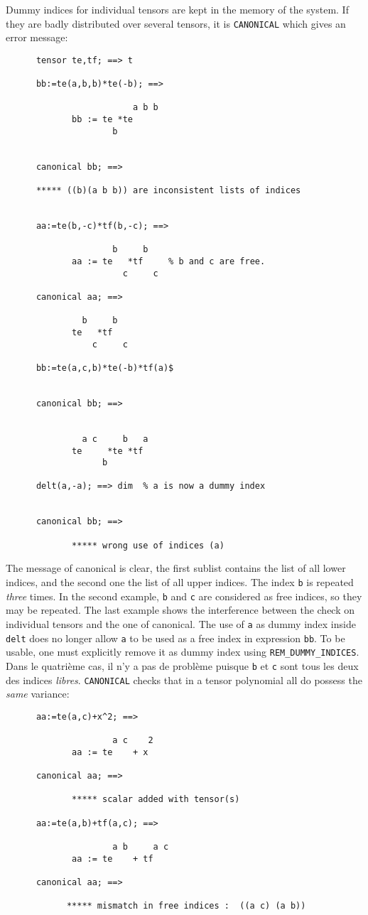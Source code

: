 Dummy indices for individual tensors are kept in the memory of 
the system. If they are badly distributed over several tensors,
it is \texttt{CANONICAL} which gives an error message:  
\begin{verbatim}
      tensor te,tf; ==> t

      bb:=te(a,b,b)*te(-b); ==>

                         a b b
             bb := te *te
                     b


      canonical bb; ==>

      ***** ((b)(a b b)) are inconsistent lists of indices


      aa:=te(b,-c)*tf(b,-c); ==>

                     b     b
             aa := te   *tf     % b and c are free.
                       c     c

      canonical aa; ==>

               b     b
             te   *tf
                 c     c

      bb:=te(a,c,b)*te(-b)*tf(a)$


      canonical bb; ==>


               a c     b   a
             te     *te *tf
                   b

      delt(a,-a); ==> dim  % a is now a dummy index


      canonical bb; ==>

             ***** wrong use of indices (a)
\end{verbatim}
The message of canonical is clear, the first sublist contains the 
list of all lower indices, and the second one the list of all upper 
indices. The index  \texttt{b} is repeated \emph{three} times.
In the second example, \texttt{b} and \texttt{c} are considered as free
indices, so they may be repeated.
The last example shows the interference between the check on 
individual tensors and the one of canonical. The use of \texttt{a}
as dummy index inside \texttt{delt} does no longer allow \texttt{a}  
to be used as a free index in expression \texttt{bb}. 
To be usable, one must explicitly remove it as dummy index 
using \texttt{REM\_DUMMY\_INDICES}.
Dans le quatri\`eme cas, il n'y a pas de probl\`eme puisque \texttt{b} et 
\texttt{c} sont tous les deux des indices \emph{libres}.
\texttt{CANONICAL} checks that in a tensor polynomial 
all do possess the \emph{same} variance:
\begin{verbatim}
      aa:=te(a,c)+x^2; ==>

                     a c    2
             aa := te    + x

      canonical aa; ==>

             ***** scalar added with tensor(s)

      aa:=te(a,b)+tf(a,c); ==>

                     a b     a c
             aa := te    + tf

      canonical aa; ==>

            ***** mismatch in free indices :  ((a c) (a b))
\end{verbatim}
